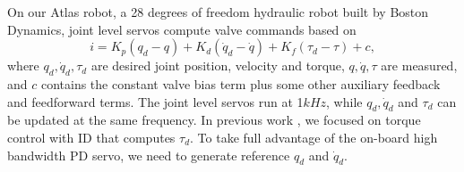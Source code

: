 \documentclass{ws-ijhr}
\begin{document}
On our Atlas robot, a 28 degrees of freedom hydraulic robot built by Boston 
Dynamics, joint level servos compute valve commands based on 
\begin{equation}
  i = K_p(q_d-q) + K_d(\dot{q}_d-\dot{q}) + K_f(\tau_d-\tau) + c,
  \label{eq:servo}
\end{equation}
where $q_d, \dot{q}_d, \tau_d$ are desired joint position, velocity and torque,
$q, \dot{q}, \tau$ are measured, and 
$c$ contains the constant valve bias term plus some other auxiliary feedback
and feedforward terms. 
The joint level servos run at 1$kHz$, while $q_d,\dot{q}_d$ and $\tau_d$ can be
updated at the same frequency.  
In previous work \cite{stephens_thesis,whitman_thesis,sfeng_online}, 
we focused on torque control with ID that computes $\tau_d$. 
To take full advantage of the on-board high bandwidth PD servo, we need to 
generate reference $q_d$ and $\dot{q}_d$. 
\end{document}
